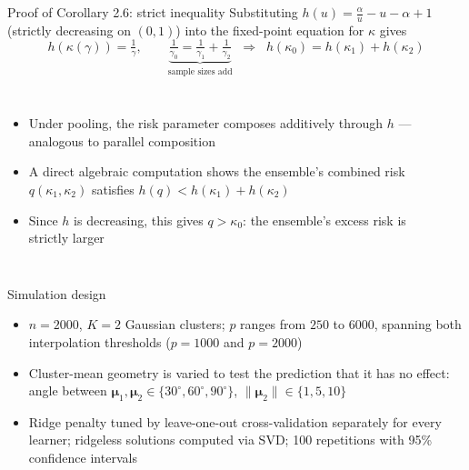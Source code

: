 \documentclass[aspectratio=169,11pt]{beamer}
\newcommand{\bmu}{\bm{\mu}}
\begin{document}
\begin{frame}{Proof of Corollary 2.6: strict inequality}
  Substituting $h(u) = \tfrac{\alpha}{u} - u - \alpha + 1$ (strictly decreasing on $(0,1)$) into the fixed-point equation for $\kappa$ gives
  \[
    h(\kappa(\gamma)) = \tfrac{1}{\gamma},
    \qquad
    \underbrace{\tfrac{1}{\gamma_0} = \tfrac{1}{\gamma_1} + \tfrac{1}{\gamma_2}}_{\text{sample sizes add}}
    \;\;\Longrightarrow\;\;
    \boxed{h(\kappa_0) = h(\kappa_1) + h(\kappa_2)}
  \]
  \begin{columns}[T]
    \begin{itemize}
      \item Under pooling, the risk parameter composes additively through $h$ --- analogous to parallel composition
      \item A direct algebraic computation shows the ensemble's combined risk $q(\kappa_1,\kappa_2)$ satisfies $h(q) < h(\kappa_1) + h(\kappa_2)$
      \item Since $h$ is decreasing, this gives $q > \kappa_0$: the ensemble's excess risk is strictly larger
    \end{itemize}
    \begin{center}
    \end{center}
  \end{columns}
\end{frame}

\begin{frame}{Simulation design}
  \begin{itemize}
    \item $n = 2000$, $K = 2$ Gaussian clusters; $p$ ranges from $250$ to $6000$, spanning both interpolation thresholds ($p = 1000$ and $p = 2000$)
    \item Cluster-mean geometry is varied to test the prediction that it has no effect: angle between $\bmu_1, \bmu_2 \in \{30^\circ, 60^\circ, 90^\circ\}$, $\|\bmu_2\| \in \{1, 5, 10\}$
    \item Ridge penalty tuned by leave-one-out cross-validation separately for every learner; ridgeless solutions computed via SVD; 100 repetitions with 95\% confidence intervals
  \end{itemize}
\end{frame}
\end{document}
